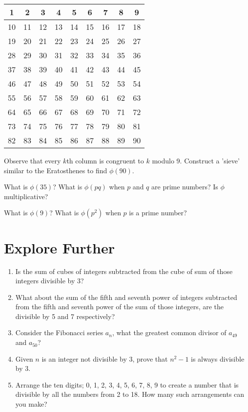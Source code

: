 \documentclass[a4paper,12pt]{article}
\begin{document}
\begin{table}[h]
  \centering
  \begin{tabular}{|c|c|c|c|c|c|c|c|c|}
    \hline
    1 & 2 & 3 & 4 & 5 & 6 & 7 & 8 & 9 \\
    \hline
    10 & 11 & 12 & 13 & 14 & 15 & 16 & 17 & 18 \\
    \hline
    19 & 20 & 21 & 22 & 23 & 24 & 25 & 26 & 27 \\
    \hline
    28 & 29 & 30 & 31 & 32 & 33 & 34 & 35 & 36 \\
    \hline
    37 & 38 & 39 & 40 & 41 & 42 & 43 & 44 & 45 \\
    \hline
    46 & 47 & 48 & 49 & 50 & 51 & 52 & 53 & 54 \\
    \hline
    55 & 56 & 57 & 58 & 59 & 60 & 61 & 62 & 63 \\
    \hline
    64 & 65 & 66 & 67 & 68 & 69 & 70 & 71 & 72 \\
    \hline
    73 & 74 & 75 & 76 & 77 & 78 & 79 & 80 & 81 \\
    \hline
    82 & 83 & 84 & 85 & 86 & 87 & 88 & 89 & 90 \\
    \hline
  \end{tabular}
\end{table}

Observe that every $k$th column is congruent to $k$ modulo 9. Construct a 'sieve' similar to the Eratosthenes to find $\phi(90)$.

What is $\phi(35)$? What is $\phi(pq)$ when $p$ and $q$ are prime numbers? Is $\phi$ multiplicative?

What is $\phi(9)$? What is $\phi(p^2)$ when $p$ is a prime number?

\newpage
\section*{Explore Further}
\begin{enumerate}
    \item Is the sum of cubes of integers subtracted from the cube of sum of those integers divisible by 3?
    \item What about the sum of the fifth and seventh power of integers subtracted from the fifth and seventh power of the sum of those integers, are the divisible by 5 and 7 respectively?
    \item Consider the Fibonacci series $a_n$, what the greatest common divisor of $a_{49}$ and $a_{50}$?
    \item Given $n$ is an integer not divisible by 3, prove that $n^2-1$ is always divisible by 3.
    \item Arrange the ten digits; 0, 1, 2, 3, 4, 5, 6, 7, 8, 9 to create a number that is divisible by all the numbers from 2 to 18. How many such arrangements can you make?


\end{enumerate}
\end{document}
